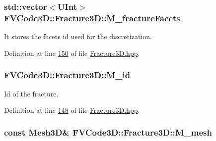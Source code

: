 \subsubsection[{\texorpdfstring{M\+\_\+fracture\+Facets}{M_fractureFacets}}]{\setlength{\rightskip}{0pt plus 5cm}std\+::vector$<${\bf U\+Int}$>$ F\+V\+Code3\+D\+::\+Fracture3\+D\+::\+M\+\_\+fracture\+Facets\hspace{0.3cm}{\ttfamily [private]}}\hypertarget{classFVCode3D_1_1Fracture3D_ab2da921dc007666c4f9111b3204f0072}{}\label{classFVCode3D_1_1Fracture3D_ab2da921dc007666c4f9111b3204f0072}


It stores the facets id used for the discretization. 



Definition at line \hyperlink{Fracture3D_8hpp_source_l00150}{150} of file \hyperlink{Fracture3D_8hpp_source}{Fracture3\+D.\+hpp}.

\subsubsection[{\texorpdfstring{M\+\_\+id}{M_id}}]{ F\+V\+Code3\+D\+::\+Fracture3\+D\+::\+M\+\_\+id\hspace{0.3cm}{\ttfamily [private]}}\hypertarget{classFVCode3D_1_1Fracture3D_a38b5200e499e51977db8f816a95eccd9}{}\label{classFVCode3D_1_1Fracture3D_a38b5200e499e51977db8f816a95eccd9}


Id of the fracture. 



Definition at line \hyperlink{Fracture3D_8hpp_source_l00148}{148} of file \hyperlink{Fracture3D_8hpp_source}{Fracture3\+D.\+hpp}.

\subsubsection[{\texorpdfstring{M\+\_\+mesh}{M_mesh}}]{\setlength{\rightskip}{0pt plus 5cm}const {\bf Mesh3D}\& F\+V\+Code3\+D\+::\+Fracture3\+D\+::\+M\+\_\+mesh\hspace{0.3cm}{\ttfamily [private]}}\hypertarget{classFVCode3D_1_1Fracture3D_ab3ceda8a7f2e67ee5d94a08be2ba2977}{}\label{classFVCode3D_1_1Fracture3D_ab3ceda8a7f2e67ee5d94a08be2ba2977}


